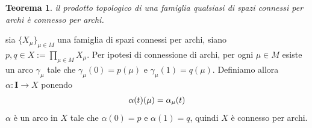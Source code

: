 \documentclass[oneside, 11pt]{amsbook}
\makeatletter
\newcommand{\0}{{(0)}}
\newcommand{\3}{{(3)}}
\theoremstyle{colonplain}
\newtheorem{thm}{Teorema}[chapter]
\theoremstyle{colondefinition}
\theoremstyle{colonremark}
\numberwithin{equation}{chapter}
\renewcommand{\proofname}{Dimostrazione}
\renewenvironment{proof}[1][\proofname]{\par
  \pushQED{\qed}%
  \normalfont \topsep6\p@\@plus6\p@\relax
  \trivlist
  \item[\hskip\labelsep\bfseries #1:]\ignorespaces
}{%
  \popQED\endtrivlist\@endpefalse
}
\makeatother
\begin{document}
\begin{thm}
il prodotto topologico di una famiglia qualsiasi di spazi connessi per archi è connesso per archi.
\end{thm}
\begin{proof}
sia $\{ X_\mu \}_{\mu \in M}$ una famiglia di spazi connessi per archi, siano $p, q \in X := \prod_{\mu \in M} X_\mu$. Per ipotesi di connessione di archi, per ogni $\mu \in M$ esiste un arco $\gamma_\mu$ tale che $\gamma_\mu(0) = p(\mu)$ e $\gamma_\mu(1) = q(\mu)$. Definiamo allora $\alpha : \mathbf{I} \longrightarrow X$ ponendo
\begin{align}
    \alpha(t)(\mu) = \alpha_\mu(t) \notag
\end{align}
$\alpha$ è un arco in $X$ tale che $\alpha(0) = p$ e $\alpha(1) = q$, quindi $X$ è connesso per archi.
\end{proof}
\end{document}
